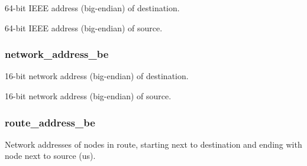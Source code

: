 64-\/bit I\-E\-E\-E address (big-\/endian) of destination. 

64-\/bit I\-E\-E\-E address (big-\/endian) of source. \hypertarget{group__xbee__route_ga73d48563eb05cd5fcc4add79d226a3b8}{
\subsubsection[{network\-\_\-address\-\_\-be}]{ network\-\_\-address\-\_\-be}}\label{group__xbee__route_ga73d48563eb05cd5fcc4add79d226a3b8}


16-\/bit network address (big-\/endian) of destination. 

16-\/bit network address (big-\/endian) of source. \hypertarget{group__xbee__route_ga943070c7e317d394725c1e65ef4efd04}{
\subsubsection[{route\-\_\-address\-\_\-be}]{ route\-\_\-address\-\_\-be}}\label{group__xbee__route_ga943070c7e317d394725c1e65ef4efd04}


Network addresses of nodes in route, starting next to destination and ending with node next to source (us). 

